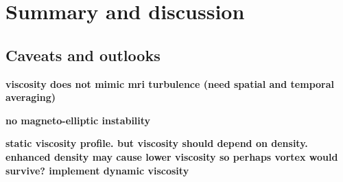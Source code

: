 \section{Summary and discussion}\label{summary}


\subsection{Caveats and outlooks}\label{caveats}
{\bf viscosity does not mimic mri turbulence (need spatial and
  temporal averaging)}

{\bf no magneto-elliptic instability}

{\bf static viscosity profile. but viscosity should depend on
  density. enhanced density may cause lower viscosity so perhaps vortex would
  survive? implement dynamic viscosity} 

